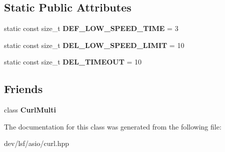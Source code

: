 \subsection*{Static Public Attributes}
\begin{DoxyCompactItemize}
\item 
\hypertarget{classlsf_1_1asio_1_1Curl_a12f19e030da55c316f22521131a17c31}{
static const size\_\-t {\bfseries DEF\_\-LOW\_\-SPEED\_\-TIME} = 3}
\label{classlsf_1_1asio_1_1Curl_a12f19e030da55c316f22521131a17c31}

\item 
\hypertarget{classlsf_1_1asio_1_1Curl_a2effe004334e50ac2cc7e5cc86ddd00b}{
static const size\_\-t {\bfseries DEL\_\-LOW\_\-SPEED\_\-LIMIT} = 10}
\label{classlsf_1_1asio_1_1Curl_a2effe004334e50ac2cc7e5cc86ddd00b}

\item 
\hypertarget{classlsf_1_1asio_1_1Curl_a9a558f342f341685238feba4e21cc2f0}{
static const size\_\-t {\bfseries DEL\_\-TIMEOUT} = 10}
\label{classlsf_1_1asio_1_1Curl_a9a558f342f341685238feba4e21cc2f0}

\end{DoxyCompactItemize}
\subsection*{Friends}
\begin{DoxyCompactItemize}
\item 
\hypertarget{classlsf_1_1asio_1_1Curl_a5301e35d2b42248ea0cac088ebedf993}{
class {\bfseries CurlMulti}}
\label{classlsf_1_1asio_1_1Curl_a5301e35d2b42248ea0cac088ebedf993}

\end{DoxyCompactItemize}


The documentation for this class was generated from the following file:\begin{DoxyCompactItemize}
\item 
dev/lsf/asio/curl.hpp\end{DoxyCompactItemize}
